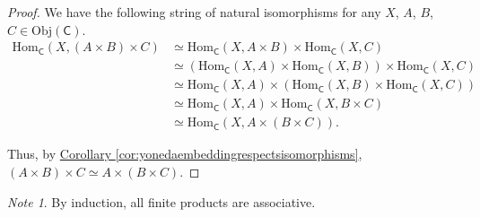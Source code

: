 \documentclass[a4paper,10pt]{scrreprt}
\newcommand{\Obj}{\mathrm{Obj}}
\newcommand{\Hom}{\mathrm{Hom}}
\theoremstyle{definition}
\theoremstyle{plain}
\theoremstyle{remark}
\newtheorem{note}{Note}[section]
\begin{document}
\begin{proof}
  We have the following string of natural isomorphisms for any $X$, $A$, $B$, $C \in \Obj(\mathsf{C})$.
  \begin{align*}
    \Hom_{\mathsf{C}}(X, (A \times B) \times C) &\simeq \Hom_{\mathsf{C}}(X, A \times B) \times \Hom_{\mathsf{C}}(X, C) \\
    & \simeq (\Hom_{\mathsf{C}}(X, A) \times \Hom_{\mathsf{C}}(X, B)) \times \Hom_{\mathsf{C}}(X, C) \\
    & \simeq \Hom_{\mathsf{C}}(X, A) \times (\Hom_{\mathsf{C}}(X, B) \times \Hom_{\mathsf{C}}(X, C)) \\
    & \simeq \Hom_{\mathsf{C}}(X, A) \times \Hom_{\mathsf{C}}(X, B \times C) \\
    & \simeq \Hom_{\mathsf{C}}(X, A \times (B \times C)).
  \end{align*}

  Thus, by \hyperref[cor:yonedaembeddingrespectsisomorphisms]{Corollary \ref*{cor:yonedaembeddingrespectsisomorphisms}}, $(A \times B) \times C \simeq A \times (B \times C)$.
\end{proof}

\begin{note}
  By induction, all finite products are associative.
\end{note}
\end{document}
